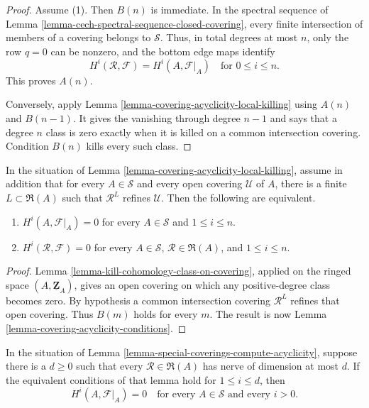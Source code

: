 \begin{proof}
Assume (1). Then $B(n)$ is immediate. In the spectral sequence of Lemma
\ref{lemma-cech-spectral-sequence-closed-covering}, every finite
intersection of members of a covering belongs to $\mathcal S$. Thus, in
total degrees at most $n$, only the row $q=0$ can be nonzero, and the bottom
edge maps identify
$$
H^i(\mathcal R,\mathcal F)=H^i(A,\mathcal F|_A)
\quad\text{for }0\leq i\leq n.
$$
This proves $A(n)$.

Conversely, apply Lemma \ref{lemma-covering-acyclicity-local-killing} using
$A(n)$ and $B(n-1)$. It gives the vanishing through degree $n-1$ and says
that a degree $n$ class is zero exactly when it is killed on a common
intersection covering. Condition $B(n)$ kills every such class.
\end{proof}

\begin{lemma}
\label{lemma-special-coverings-compute-acyclicity}
\begin{reference}
\cite[Chapter III, \S 3.9, Corollary 2 to Theorem 3.9.1,
p. 179]{Tohoku}
\end{reference}
In the situation of Lemma
\ref{lemma-covering-acyclicity-local-killing}, assume in addition that for
every $A\in\mathcal S$ and every open covering $\mathcal U$ of $A$, there
is a finite $L\subset\mathfrak R(A)$ such that $\mathcal R^L$ refines
$\mathcal U$. Then the following are equivalent.
\begin{enumerate}
\item $H^i(A,\mathcal F|_A)=0$ for every $A\in\mathcal S$ and
$1\leq i\leq n$.
\item $H^i(\mathcal R,\mathcal F)=0$ for every $A\in\mathcal S$,
$\mathcal R\in\mathfrak R(A)$, and $1\leq i\leq n$.
\end{enumerate}
\end{lemma}

\begin{proof}
Lemma \ref{lemma-kill-cohomology-class-on-covering}, applied on the
ringed space $(A,\underline{\mathbf Z}_A)$, gives an open covering on which
any positive-degree class becomes zero. By hypothesis a common intersection
covering $\mathcal R^L$ refines that open covering. Thus $B(m)$ holds for
every $m$. The result is now Lemma
\ref{lemma-covering-acyclicity-conditions}.
\end{proof}

\begin{lemma}
\label{lemma-bounded-nerve-special-coverings-acyclic}
\begin{reference}
\cite[Chapter III, \S 3.9, Corollary 3 to Theorem 3.9.1,
p. 180]{Tohoku}
\end{reference}
In the situation of Lemma
\ref{lemma-special-coverings-compute-acyclicity}, suppose there is a
$d\geq0$ such that every $\mathcal R\in\mathfrak R(A)$ has nerve of
dimension at most $d$. If the equivalent conditions of that lemma hold for
$1\leq i\leq d$, then
$$
H^i(A,\mathcal F|_A)=0
\quad\text{for every }A\in\mathcal S\text{ and every }i>0.
$$
\end{lemma}


